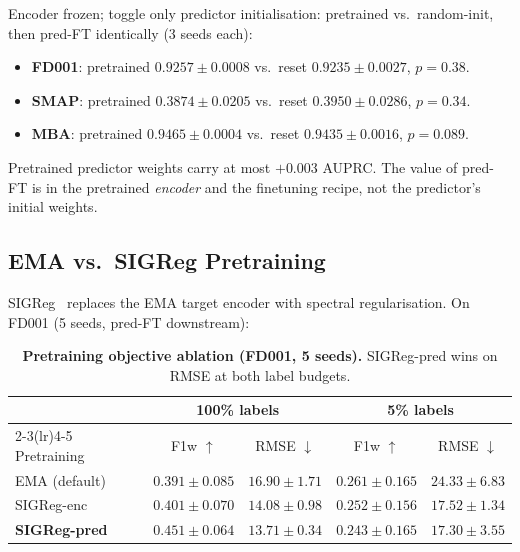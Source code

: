 \documentclass{article}
\begin{document}
Encoder frozen; toggle only predictor initialisation: pretrained vs.\ random-init, then pred-FT identically (3 seeds each):

\begin{itemize}[nosep]
  \item \textbf{FD001}: pretrained $0.9257 \pm 0.0008$ vs.\ reset $0.9235 \pm 0.0027$, $p = 0.38$.
  \item \textbf{SMAP}: pretrained $0.3874 \pm 0.0205$ vs.\ reset $0.3950 \pm 0.0286$, $p = 0.34$.
  \item \textbf{MBA}: pretrained $0.9465 \pm 0.0004$ vs.\ reset $0.9435 \pm 0.0016$, $p = 0.089$.
\end{itemize}

Pretrained predictor weights carry at most $+0.003$ AUPRC. The value of pred-FT is in the pretrained \emph{encoder} and the finetuning recipe, not the predictor's initial weights.

\subsection{EMA vs.\ SIGReg Pretraining}
\label{app:sigreg_ablation}

SIGReg~\citep{balestriero2025lejepa} replaces the EMA target encoder with spectral regularisation. On FD001 (5 seeds, pred-FT downstream):

\begin{table}[h]
  \centering
  \caption{\textbf{Pretraining objective ablation (FD001, 5 seeds).} SIGReg-pred wins on RMSE at both label budgets.}
  \label{tab:sigreg_ablation}
  \small
  \begin{tabular}{lcccc}
    \toprule
                         & \multicolumn{2}{c}{\textbf{100\% labels}} & \multicolumn{2}{c}{\textbf{5\% labels}}                                                 \\
    \cmidrule(lr){2-3}\cmidrule(lr){4-5}
    Pretraining          & F1w $\uparrow$                            & RMSE $\downarrow$                       & F1w $\uparrow$    & RMSE $\downarrow$         \\
    \midrule
    EMA (default)        & $0.391 \pm 0.085$                         & $16.90 \pm 1.71$                        & $0.261 \pm 0.165$ & $24.33 \pm 6.83$          \\
    SIGReg-enc           & $0.401 \pm 0.070$                         & $14.08 \pm 0.98$                        & $0.252 \pm 0.156$ & $17.52 \pm 1.34$          \\
    \textbf{SIGReg-pred} & $\mathbf{0.451 \pm 0.064}$                & $\mathbf{13.71 \pm 0.34}$               & $0.243 \pm 0.165$ & $\mathbf{17.30 \pm 3.55}$ \\
    \bottomrule
  \end{tabular}
\end{table}
\end{document}
